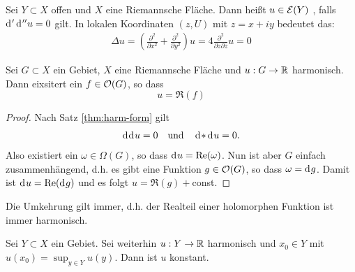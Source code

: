 \begin{defin}
  Sei $Y \subset X$ offen und $X$ eine Riemannsche Fläche. Dann heißt
  $u \in \mathcal{E}(Y)$ , falls $\d['\d[''u]] = 0$ gilt.
  In lokalen Koordinaten $(z,U)$ mit $z = x + iy$ bedeutet das:
  \begin{align*}
    \Delta u = \left ( \frac{\partial^2}{\partial x^2} +
      \frac{\partial^2}{\partial y^2} \right ) u = 4
    \frac{\partial^2}{\partial z \partial \bar z} u = 0
  \end{align*}
\end{defin}

\begin{prop}
  \label{prop:harm-realteil-hol}
  Sei $G \subset X$ ein Gebiet, $X$ eine Riemannsche Fläche
  und $u: G \rightarrow \mathbb{R}$ harmonisch. Dann eixsitert ein $f \in \mathcal{O}(G)$, so dass
  \[
  u = \Re(f)
  \]
\end{prop}

\begin{proof}
  Nach Satz \ref{thm:harm-form} gilt
  \begin{align*}
    \d[\d[u]] = 0 \quad \text{und} \quad \d[\ast\d[u]] = 0.
  \end{align*}
  Also existiert ein $\omega \in \Omega(G)$, so dass $\d[u] =
  \Re(\omega)$. Nun ist aber $G$ einfach zusammenhängend, d.h. es gibt
  eine Funktion $g \in \mathcal{O}(G)$, so dass $\omega = \d[g]$. Damit ist
  $\d[u] = \Re(\d[g])$ und es folgt $u = \Re(g) +$const.
\end{proof}

\begin{rem}
  Die Umkehrung gilt immer, d.h. der Realteil einer holomorphen
  Funktion ist immer harmonisch.
\end{rem}

\begin{prop}
  \label{prop:max-prinzip-harm}
  Sei $Y \subset X$ ein Gebiet. Sei weiterhin $u: Y \rightarrow \mathbb{R}$ harmonisch
  und $x_0 \in Y$ mit $u(x_0) = \sup_{y \in Y} u(y)$. Dann ist $u$ konstant.
\end{prop}

